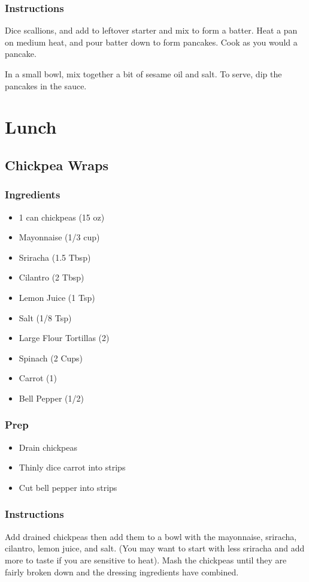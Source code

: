 \documentclass[11pt]{article}
\begin{document}
\subsubsection{Instructions}
\label{sec:org2acc70f}
Dice scallions, and add to leftover starter and mix to form a
batter. Heat a pan on medium heat, and pour batter down to form
pancakes. Cook as you would a pancake.

In a small bowl, mix together a bit of sesame oil and salt.
To serve, dip the pancakes in the sauce.
\section{Lunch}
\label{sec:org8788c91}
\subsection{Chickpea Wraps}
\label{sec:org0c0c69d}
\subsubsection{Ingredients}
\label{sec:orgad44150}
\begin{itemize}
\item 1 can chickpeas (15 oz)
\item Mayonnaise (1/3 cup)
\item Sriracha (1.5 Tbsp)
\item Cilantro (2 Tbsp)
\item Lemon Juice (1 Tsp)
\item Salt (1/8 Tsp)
\item Large Flour Tortillas (2)
\item Spinach (2 Cups)
\item Carrot (1)
\item Bell Pepper (1/2)
\end{itemize}
\subsubsection{Prep}
\label{sec:orgb85426f}
\begin{itemize}
\item Drain chickpeas
\item Thinly dice carrot into strips
\item Cut bell pepper into strips
\end{itemize}
\subsubsection{Instructions}
\label{sec:org85792ea}
Add drained chickpeas then add them to a bowl with the mayonnaise,
sriracha, cilantro, lemon juice, and salt. (You may want to start
with less sriracha and add more to taste if you are sensitive to
heat). Mash the chickpeas until they are fairly broken down and
the dressing ingredients have combined.
\end{document}
